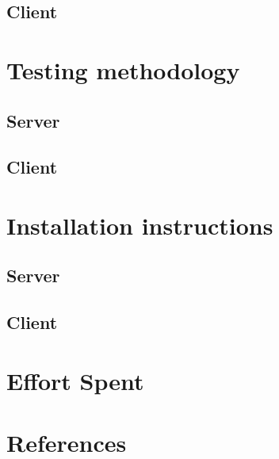 	\section{Client}
\newpage
\chapter{Testing methodology}
	\section{Server}
		
	\section{Client}
\newpage
\chapter{Installation instructions}
	\section{Server}
		
	\section{Client}
\newpage
\chapter{Effort Spent}
    
\chapter{References}
	


